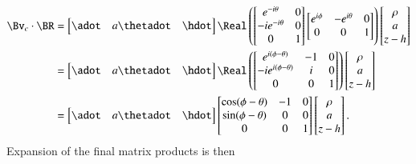 {%
\begin{equation}\label{eqn:relativisticElectrodynamicsExamReflection:1250}
\begin{aligned}
\Bv_c \cdot \BR
&=
\begin{bmatrix}
\adot &
a \thetadot &
\hdot
\end{bmatrix}
\Real \left(
\begin{bmatrix}
e^{-i\theta}  & 0 \\
-i e^{-i\theta}  & 0 \\
0 & 1
\end{bmatrix}
\begin{bmatrix}
e^{i\phi} & -e^{i\theta} & 0 \\
0 & 0 & 1
\end{bmatrix}
\right)
\begin{bmatrix}
\rho \\
a \\
z - h
\end{bmatrix} \\
&=
\begin{bmatrix}
\adot &
a \thetadot &
\hdot
\end{bmatrix}
\Real \left(
\begin{bmatrix}
e^{i(\phi - \theta)} & -1 & 0  \\
-i e^{i(\phi - \theta)} & i & 0 \\
0 & 0 & 1
\end{bmatrix}
\right)
\begin{bmatrix}
\rho \\
a \\
z - h
\end{bmatrix} \\
&=
\begin{bmatrix}
\adot &
a \thetadot &
\hdot
\end{bmatrix}
\begin{bmatrix}
\cos(\phi - \theta) & -1 & 0  \\
\sin(\phi - \theta) & 0 & 0 \\
0 & 0 & 1
\end{bmatrix}
\begin{bmatrix}
\rho \\
a \\
z - h
\end{bmatrix}.
\end{aligned}
\end{equation}
%
Expansion of the final matrix products is then
%
\begin{equation}\label{eqn:relativisticElectrodynamicsExamReflection:880}

\end{equation}}
